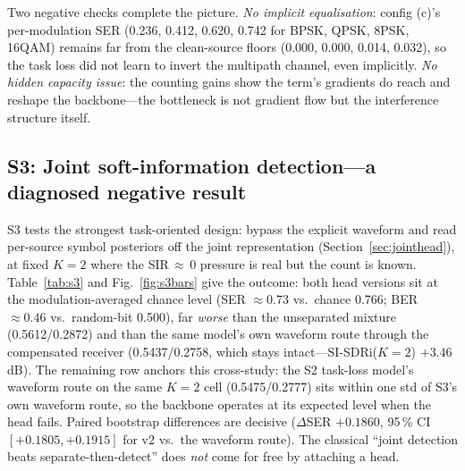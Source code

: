 \documentclass[review,12pt]{elsarticle}
\begin{document}
Two negative checks complete the picture. \emph{No implicit
equalisation}: config (c)'s per-modulation SER (0.236, 0.412, 0.620,
0.742 for BPSK, QPSK, 8PSK, 16QAM) remains far from the clean-source
floors (0.000, 0.000, 0.014, 0.032), so the task loss did not learn to
invert the multipath channel, even implicitly. \emph{No hidden capacity issue}:
the counting gains show the term's gradients do reach and reshape the
backbone---the bottleneck is not gradient flow but the interference
structure itself.

\subsection{S3: Joint soft-information detection---a diagnosed negative result}
\label{sec:s3}

S3 tests the strongest task-oriented design: bypass the explicit
waveform and read per-source symbol posteriors off the joint
representation (Section~\ref{sec:jointhead}), at fixed $K{=}2$ where the
SIR$\,\approx\,$0 pressure is real but the count is known.
Table~\ref{tab:s3} and Fig.~\ref{fig:s3bars} give the outcome: both head
versions sit at the modulation-averaged chance level (SER
$\approx 0.73$ vs.\ chance 0.766; BER $\approx 0.46$ vs.\ random-bit
0.500), far \emph{worse} than the unseparated mixture (0.5612/0.2872)
and than the same model's own waveform route through the compensated
receiver (0.5437/0.2758, which stays intact---SI-SDRi($K{=}2$)
$+3.46$\,dB). The remaining row anchors this cross-study: the S2
task-loss model's waveform route on the same $K{=}2$ cell
(0.5475/0.2777) sits within one std of S3's own waveform route, so the
backbone operates at its expected level when the head fails. Paired
bootstrap differences are decisive ($\Delta$SER
$+0.1860$, 95\,\% CI $[+0.1805, +0.1915]$ for v2 vs.\ the waveform
route). The classical ``joint detection beats separate-then-detect''
does \emph{not} come for free by attaching a head.
\end{document}
